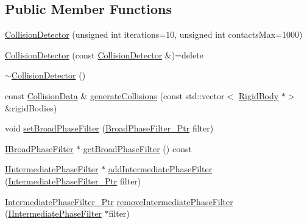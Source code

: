 \subsection*{Public Member Functions}
\begin{DoxyCompactItemize}
\item 
\mbox{\hyperlink{classrum_1_1_collision_detector_a5547ad2cf2a42536f8d653405bbb6485}{Collision\+Detector}} (unsigned int iterations=10, unsigned int contacts\+Max=1000)
\item 
\mbox{\hyperlink{classrum_1_1_collision_detector_a55d704761a707ed6a8a6842f3d5058b5}{Collision\+Detector}} (const \mbox{\hyperlink{classrum_1_1_collision_detector}{Collision\+Detector}} \&)=delete
\item 
\mbox{\hyperlink{classrum_1_1_collision_detector_a9bf8f0c5853254f4a905879ab0187858}{$\sim$\+Collision\+Detector}} ()
\item 
const \mbox{\hyperlink{classrum_1_1_collision_data}{Collision\+Data}} \& \mbox{\hyperlink{classrum_1_1_collision_detector_aa8096b4bb5f7b6ebf1605202ef170734}{generate\+Collisions}} (const std\+::vector$<$ \mbox{\hyperlink{classrum_1_1_rigid_body}{Rigid\+Body}} $\ast$$>$ \&rigid\+Bodies)
\item 
void \mbox{\hyperlink{classrum_1_1_collision_detector_aa79501a56911cc6ea64e53278bedb2cb}{set\+Broad\+Phase\+Filter}} (\mbox{\hyperlink{classrum_1_1_collision_detector_a76f794d3db7491b5b21137c6332eccb3}{Broad\+Phase\+Filter\+\_\+\+Ptr}} filter)
\item 
\mbox{\hyperlink{classrum_1_1_i_broad_phase_filter}{I\+Broad\+Phase\+Filter}} $\ast$ \mbox{\hyperlink{classrum_1_1_collision_detector_aa03aaf950039ff0cac3013c8b23ed8d6}{get\+Broad\+Phase\+Filter}} () const
\item 
\mbox{\hyperlink{classrum_1_1_i_intermediate_phase_filter}{I\+Intermediate\+Phase\+Filter}} $\ast$ \mbox{\hyperlink{classrum_1_1_collision_detector_ac94d9993483834effa1baea4ca938ad3}{add\+Intermediate\+Phase\+Filter}} (\mbox{\hyperlink{classrum_1_1_collision_detector_aa1a7155543cdbe0265865b3e6f14b260}{Intermediate\+Phase\+Filter\+\_\+\+Ptr}} filter)
\item 
\mbox{\hyperlink{classrum_1_1_collision_detector_aa1a7155543cdbe0265865b3e6f14b260}{Intermediate\+Phase\+Filter\+\_\+\+Ptr}} \mbox{\hyperlink{classrum_1_1_collision_detector_a94446ddd3ad221a5403288f91fc538d9}{remove\+Intermediate\+Phase\+Filter}} (\mbox{\hyperlink{classrum_1_1_i_intermediate_phase_filter}{I\+Intermediate\+Phase\+Filter}} $\ast$filter)
\item 
$$
\end{DoxyCompactItemize}
